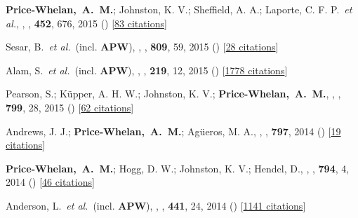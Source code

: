 \item[{\color{deemph}\scriptsize18}]\textbf{Price-Whelan,~A.~M.}; Johnston, K. V.; Sheffield, A. A.; Laporte, C. F. P.~\textit{et al.}, , \mnras, \textbf{452}, 676, 2015 () [\href{http://adsabs.harvard.edu/abs/2015MNRAS.452..676P}{83 citations}]

\item[{\color{deemph}\scriptsize17}]Sesar, B.~\textit{et al.}~(incl. \textbf{APW}), , \apj, \textbf{809}, 59, 2015 () [\href{http://adsabs.harvard.edu/abs/2015ApJ...809...59S}{28 citations}]

\item[{\color{deemph}\scriptsize16}]Alam, S.~\textit{et al.}~(incl. \textbf{APW}), , \apjs, \textbf{219}, 12, 2015 () [\href{http://adsabs.harvard.edu/abs/2015ApJS..219...12A}{1778 citations}]

\item[{\color{deemph}\scriptsize15}]Pearson, S.; K{\"u}pper, A. H. W.; Johnston, K. V.; \textbf{Price-Whelan,~A.~M.}, , \apj, \textbf{799}, 28, 2015 () [\href{http://adsabs.harvard.edu/abs/2015ApJ...799...28P}{62 citations}]

\item[{\color{deemph}\scriptsize14}]Andrews, J. J.; \textbf{Price-Whelan,~A.~M.}; Ag{\"u}eros, M. A., , \apj, \textbf{797}, 2014 () [\href{http://adsabs.harvard.edu/abs/2014ApJ...797L..32A}{19 citations}]

\item[{\color{deemph}\scriptsize13}]\textbf{Price-Whelan,~A.~M.}; Hogg, D. W.; Johnston, K. V.; Hendel, D., , \apj, \textbf{794}, 4, 2014 () [\href{http://adsabs.harvard.edu/abs/2014ApJ...794....4P}{46 citations}]

\item[{\color{deemph}\scriptsize12}]Anderson, L.~\textit{et al.}~(incl. \textbf{APW}), , \mnras, \textbf{441}, 24, 2014 () [\href{http://adsabs.harvard.edu/abs/2014MNRAS.441...24A}{1141 citations}]

